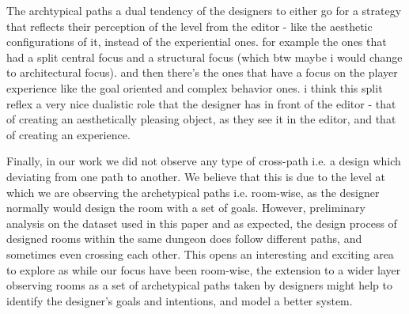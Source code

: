 The archtypical paths a dual tendency of the designers to either go for a strategy that reflects their perception of the level from the editor - like the aesthetic configurations of it, instead of the experiential ones. for example the ones that had a split central focus and a structural focus (which btw maybe i would change to architectural focus). and then there's the ones that have a focus on the player experience like the goal oriented and complex behavior ones. i think this split reflex a very nice dualistic role that the designer has in front of the editor - that of creating an aesthetically pleasing object, as they see it in the editor, and that of creating an experience.


Finally, in our work we did not observe any type of cross-path i.e. a design which deviating from one path to another. We believe that this is due to the level at which we are observing the archetypical paths i.e. room-wise, as the designer normally would design the room with a set of goals. However, preliminary analysis on the dataset used in this paper and as expected, the design process of designed rooms within the same dungeon does follow different paths, and sometimes even crossing each other. This opens an interesting and exciting area to explore as while our focus have been room-wise, the extension to a wider layer observing rooms as a set of archetypical paths taken by designers might help to identify the designer's goals and intentions, and model a better system.